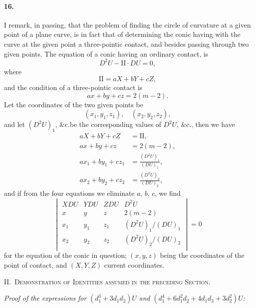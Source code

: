 \documentclass[12pt,a4paper]{article}
\theoremstyle{plain}
\begin{document}
\paragraph{16.}
I  remark,  in  passing,  that  the  problem  of  finding  the  circle  of  curvature  at
a  given  point  of  a  plane  curve,  is  in  fact  that  of  determining  the  conic  having  with
the  curve  at  the  given  point  a  three-pointic  contact,  and  besides  passing  through  two
given  points.     The  equation  of  a  conic  having  an  ordinary  contact,  is
\[
D^2 U - \mathrm{II} \cdot DU = 0,
\]
where
\[
\mathrm{II} = aX + bY + cZ,
\]
and  the  condition  of  a  three-pointic  contact  is
\[
ax + by + cz = 2(m-2).
\]
Let  the  coordinates  of  the  two  given  points  be
\[
(x_1, y_1, z_1), \quad (x_2, y_2, z_2),
\]
and  let  $(D^2 U)_1$,  \&c.\@  be  the  corresponding  values  of  $D^2 U$,  \&c.,  then  we  have
\begin{align*}
aX + bY + cZ &= \mathrm{II}, \\
ax + by + cz &= 2(m-2), \\
ax_1 + by_1 + cz_1 &= \frac{(D^2 U)_1}{(DU)_1}, \\
ax_2 + by_2 + cz_2 &= \frac{(D^2 U)_2}{(DU)_2},
\end{align*}
and  if  from  the  four  equations  we  eliminate  $a$,  $b$,  $c$,  we  find
\[
\begin{vmatrix}
XDU & YDU & ZDU & D^2 U \\
x & y & z & 2(m-2) \\
x_1 & y_1 & z_1 & (D^2 U)_1/(DU)_1 \\
x_2 & y_2 & z_2 & (D^2 U)_2/(DU)_2 \\
\end{vmatrix} = 0
\]
for  the   equation   of   the  conic  in   question;   $(x, y, z)$   being   the   coordinates   of  the   point
of  contact,  and  $(X, Y, Z)$  current  coordinates.

\newpage
\noindent\textsc{II.~Demonstration of Identities assumed in the preceding Section.}

\medskip

\noindent\textit{Proof of the expressions for $(d_1^3 + 3d_1 d_2)U$ and $(d_1^4 + 6d_1^2 d_2 + 4d_1 d_3 + 3d_2^2)U$:}
\end{document}
